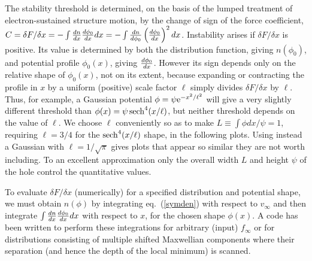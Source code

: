 \documentclass[12pt]{article}
\begin{document}
The stability threshold is determined, on the basis of the lumped
treatment of electron-sustained structure motion, by the change of sign
of the force coefficient,
$C=\delta F/\delta x=-\int{dn\over dx}{d\phi_0\over dx} dx = -\int
{dn\over d\phi_0}\left(d\phi_0\over dx\right)^2 dx$. Instability
arises if $\delta F/\delta x$ is positive. Its value is determined by
both the distribution function, giving $n(\phi_0)$, and potential
profile $\phi_0(x)$, giving ${d\phi_0\over dx}$. However its sign
depends only on the relative shape of $\phi_0(x)$, not on its extent,
because expanding or contracting the profile in $x$ by a uniform
(positive) scale factor $\ell$ simply divides $\delta F/\delta x$ by
$\ell$.  Thus, for example, a Gaussian potential
$\phi=\psi {\rm e}^{-x^2/\ell^2}$ will give a very slightly different
threshold than $\phi(x)=\psi\, {\rm sech}^4(x/\ell)$, but neither
threshold depends on the value of $\ell$. We choose $\ell$ conveniently so
as to make $L\equiv\int \phi dx/\psi=1$, requiring $\ell=3/4$ for the
${\rm sech}^4(x/\ell)$ shape, in the following plots. Using instead a Gaussian
with $\ell=1/\sqrt{\pi}$ gives plots that appear so similar they are
not worth including. To an excellent approximation only the overall
width $L$ and height $\psi$ of the hole control the quantitative values.

To evaluate $\delta F/\delta x$ (numerically) for a specified distribution and
potential shape, we must obtain $n(\phi)$ by integrating eq.\
(\ref{symden}) with respect to $v_\infty$ and then integrate
$\int{dn\over dx}{d\phi_0\over dx} dx$ with respect to $x$, for the
chosen shape $\phi(x)$. A code has been written to perform these
integrations for arbitrary (input) $f_\infty$ or for distributions
consisting of multiple shifted Maxwellian components where
their separation (and hence the depth of the local minimum) is scanned. 
\end{document}
